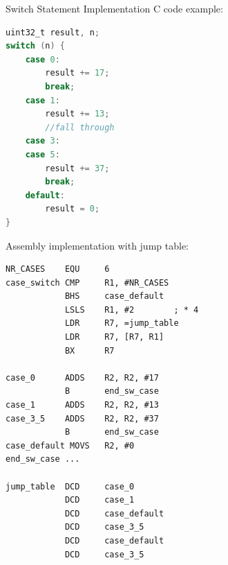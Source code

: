\begin{example2}{Switch Statement Implementation}
C code example:
\begin{lstlisting}[language=C, style=basesmol]
uint32_t result, n;
switch (n) {
    case 0:
        result += 17;
        break;
    case 1:
        result += 13;
        //fall through
    case 3: 
    case 5:
        result += 37;
        break;
    default:
        result = 0;
}
\end{lstlisting}

Assembly implementation with jump table:
\begin{lstlisting}[language=armasm, style=basesmol]
NR_CASES    EQU     6
case_switch CMP     R1, #NR_CASES
            BHS     case_default
            LSLS    R1, #2        ; * 4
            LDR     R7, =jump_table
            LDR     R7, [R7, R1]
            BX      R7

case_0      ADDS    R2, R2, #17
            B       end_sw_case
case_1      ADDS    R2, R2, #13
case_3_5    ADDS    R2, R2, #37
            B       end_sw_case
case_default MOVS   R2, #0
end_sw_case ...

jump_table  DCD     case_0
            DCD     case_1
            DCD     case_default
            DCD     case_3_5
            DCD     case_default
            DCD     case_3_5
\end{lstlisting}
\end{example2}


